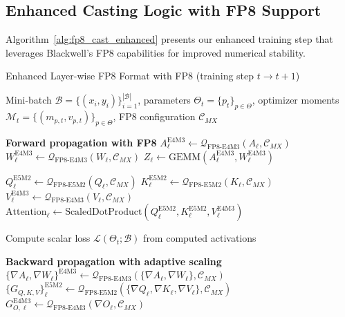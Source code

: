 \documentclass[conference]{IEEEtran}
\begin{document}
\subsection{Enhanced Casting Logic with FP8 Support}

Algorithm~\ref{alg:fp8_cast_enhanced} presents our enhanced training step that leverages Blackwell's FP8 capabilities for improved numerical stability.

\begin{algorithm}[hbt!]
\caption{Enhanced Layer-wise FP8 Format with FP8 (training step $t \to t+1$)}
\label{alg:fp8_cast_enhanced}
\begin{algorithmic}
\Require Mini-batch $\mathcal{B}=\{(x_i,y_i)\}_{i=1}^{|\mathcal{B}|}$,
         parameters $\Theta_t=\{p_t\}_{p\in\Theta}$,
         optimizer moments $\mathcal{M}_t=\{(m_{p,t},v_{p,t})\}_{p\in\Theta}$,
         FP8 configuration $\mathcal{C}_{MX}$
\Statex

\State \textbf{Forward propagation with FP8}
  \State $A_\ell^{\text{E4M3}} \gets \mathcal{Q}_{\text{FP8-E4M3}}(A_{\ell}, \mathcal{C}_{MX})$
  \State $W_\ell^{\text{E4M3}} \gets \mathcal{Q}_{\text{FP8-E4M3}}(W_{\ell}, \mathcal{C}_{MX})$
  \State $Z_\ell \gets \text{GEMM}(A_\ell^{\text{E4M3}}, W_\ell^{\text{E4M3}})$
\EndFor

  \State $Q_\ell^{\text{E5M2}} \gets \mathcal{Q}_{\text{FP8-E5M2}}(Q_{\ell}, \mathcal{C}_{MX})$
  \State $K_\ell^{\text{E5M2}} \gets \mathcal{Q}_{\text{FP8-E5M2}}(K_{\ell}, \mathcal{C}_{MX})$
  \State $V_\ell^{\text{E4M3}} \gets \mathcal{Q}_{\text{FP8-E4M3}}(V_{\ell}, \mathcal{C}_{MX})$
  \State $\text{Attention}_\ell \gets \text{ScaledDotProduct}(Q_\ell^{\text{E5M2}}, K_\ell^{\text{E5M2}}, V_\ell^{\text{E4M3}})$
\EndFor

\State Compute scalar loss $\mathcal{L}(\Theta_t;\mathcal{B})$ from computed activations

\Statex

\State \textbf{Backward propagation with adaptive scaling}
  \State $\{\nabla A_\ell,\nabla W_\ell\}^{\text{E4M3}}
         \gets \mathcal{Q}_{\text{FP8-E4M3}}(\{\nabla A_\ell,\nabla W_\ell\}, \mathcal{C}_{MX})$
\EndFor
{}
  \State $\{G_{Q,K,V}\}_{\ell}^{\text{E5M2}}
         \gets \mathcal{Q}_{\text{FP8-E5M2}}(\{\nabla Q_\ell, \nabla K_\ell, \nabla V_\ell\}, \mathcal{C}_{MX})$
  \State $G_{O,\ell}^{\text{E4M3}}
         \gets \mathcal{Q}_{\text{FP8-E4M3}}(\nabla O_\ell, \mathcal{C}_{MX})$
\EndFor


\end{algorithmic}
\end{algorithm}
\end{document}
